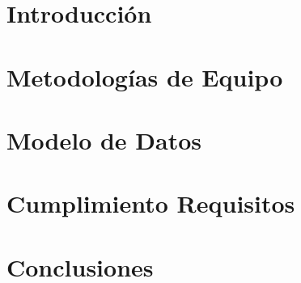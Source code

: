 \documentclass[letterpaper,11pt]{article} %
\begin{document}









\section{Introducción}


\newpage
\section{Metodologías de Equipo}


\newpage
\section{Modelo de Datos}


\newpage
\section{Cumplimiento Requisitos}


\newpage
\section{Conclusiones}



\end{document}
